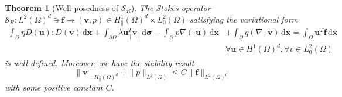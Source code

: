 \documentclass[final,leqno]{scrarticle}
\newtheorem{theorem}{Theorem}[section]
\newcommand{\calS}{\mathcal{S}}
\newcommand{\lzo}{L^2(\Omega)}
\newcommand{\Htd}{{H^1_\|(\Omega)^d}}
\newcommand{\lzd}{{L^2(\Omega)^d}}
\newcommand{\dd}{\, \mathrm{d}}
\begin{document}
\begin{theorem}[Well-posedness of $\calS_R$] \label{lemma:exuni_Stilde}
The Stokes operator $\calS_R: L^2(\Omega)^d \ni\mathbf{f} \mapsto (\mathbf{v},p)\in H^1_{\parallel}(\Omega)^d \times L_0^2(\Omega)$ satisfying the variational form
 \begin{align}  \int_{\Omega} \eta D(\mathbf{u}) : D(\mathbf{v}) \dd \mathbf{x}
    + \int_{\partial\Omega}\lambda  \mathbf{u}_{\parallel}^T \mathbf{v}_{\parallel} \dd \boldsymbol{\sigma} 
    - \int_{\Omega} p \nabla( \cdot\mathbf{u}) \dd \mathbf{x} &+ \int_{\Omega} q (\nabla \cdot\mathbf{v}) \dd \mathbf{x} = \int_{\Omega} \mathbf{u}^T \mathbf{f} \dd \mathbf{x}\\& %
    \forall \mathbf{u} \in H^1_{\parallel}(\Omega)^d, \forall v\in L^2_0(\Omega) \nonumber
 \end{align}
 is well-defined. Moreover, we have the stability result
 \begin{equation}
     \label{eq:stability}
  \|\mathbf{v}\|_\Htd+\|p\|_{\lzo} \leq C\|\mathbf{f}\|_\lzd   
 \end{equation}
 with some positive constant $C$.
\end{theorem}
\end{document}

